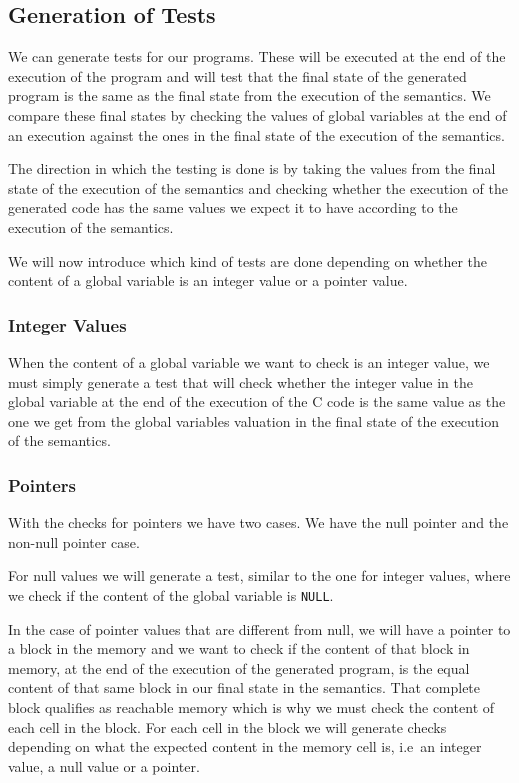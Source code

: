 \subsection{Generation of Tests}

We can generate tests for our programs.
These will be executed at the end of the execution of the program and will test that the final state of the generated program is the same as the final state from the execution of the semantics.
We compare these final states by checking the values of global variables at the end of an execution against the ones in the final state of the execution of the semantics.

The direction in which the testing is done is by taking the values from the final state of the execution of the semantics and checking whether the execution of the generated code has the same values we expect it to have according to the execution of the semantics.

We will now introduce which kind of tests are done depending on whether the content of a global variable is an integer value or a pointer value.

\subsubsection{Integer Values}

When the content of a global variable we want to check is an integer value, we must simply generate a test that will check whether the integer value in the global variable at the end of the execution of the C code is the same value as the one we get from the global variables valuation in the final state of the execution of the semantics.

\subsubsection{Pointers}

With the checks for pointers we have two cases.
We have the null pointer and the non-null pointer case.

For null values we will generate a test, similar to the one for integer values, where we check if the content of the global variable is \verb|NULL|.

In the case of pointer values that are different from null, we will have a pointer to a block in the memory and we want to check if the content of that block in memory, at the end of the execution of the generated program, is the equal content of that same block in our final state in the semantics.
That complete block qualifies as reachable memory which is why we must check the content of each cell in the block.
For each cell in the block we will generate checks depending on what the expected content in the memory cell is, i.e\ an integer value, a null value or a pointer.

